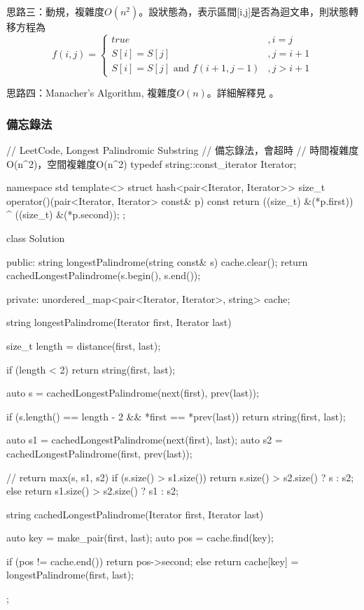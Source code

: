 思路三：動規，複雜度$O(n^2)$。設狀態為，表示區間[i,j]是否為迴文串，則狀態轉移方程為
$$
f(i,j)=\begin{cases}
true & ,i=j\\
S[i]=S[j] & , j = i + 1 \\
S[i]=S[j] \text{ and } f(i+1, j-1) & , j > i + 1
\end{cases}
$$

思路四：Manacher’s Algorithm, 複雜度$O(n)$。詳細解釋見  。


\subsubsection{備忘錄法}
\begin{Code}
// LeetCode, Longest Palindromic Substring
// 備忘錄法，會超時
// 時間複雜度O(n^2)，空間複雜度O(n^2)
typedef string::const_iterator Iterator;

namespace std {
template<>
struct hash<pair<Iterator, Iterator>> {
    size_t operator()(pair<Iterator, Iterator> const& p) const {
        return ((size_t) &(*p.first)) ^ ((size_t) &(*p.second));
    }
};
}

class Solution {
public:
    string longestPalindrome(string const& s) {
        cache.clear();
        return cachedLongestPalindrome(s.begin(), s.end());
    }

private:
    unordered_map<pair<Iterator, Iterator>, string> cache;

    string longestPalindrome(Iterator first, Iterator last) {
        size_t length = distance(first, last);

        if (length < 2) return string(first, last);

        auto s = cachedLongestPalindrome(next(first), prev(last));

        if (s.length() == length - 2 && *first == *prev(last))
            return string(first, last);

        auto s1 = cachedLongestPalindrome(next(first), last);
        auto s2 = cachedLongestPalindrome(first, prev(last));

        // return max(s, s1, s2)
        if (s.size() > s1.size()) return s.size() > s2.size() ? s : s2;
        else return s1.size() > s2.size() ? s1 : s2;
    }

    string cachedLongestPalindrome(Iterator first, Iterator last) {
        auto key = make_pair(first, last);
        auto pos = cache.find(key);

        if (pos != cache.end()) return pos->second;
        else return cache[key] = longestPalindrome(first, last);
    }
};
\end{Code}


